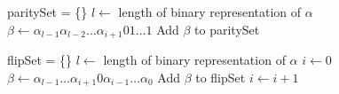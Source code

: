 \begin{algorithm}[htbp]
    \caption{\label{GenerateParitySet}\textsc{GenerateParitySet}}
\begin{algorithmic}[1]
\State paritySet = \{\}
\State $l \gets $ length of binary representation of $\alpha$
        \State $\beta \gets \alpha_{l-1}\alpha_{l-2}\ldots\alpha_{i+1}01\ldots 1$
        \State Add $\beta$ to paritySet 
    \EndIf
\EndFor
\end{algorithmic}
\end{algorithm}
\begin{algorithm}[htbp]
    \caption{\label{GenerateFlipSet}\textsc{GenerateFlipSet}}
\begin{algorithmic}[1]
\State flipSet = \{\}
\State $l \gets $ length of binary representation of $\alpha$
\State $i \gets 0$
    \State $\beta \gets \alpha_{l-1}\ldots \alpha_{i+1}0\alpha_{i-1} \ldots \alpha_0$
    \State Add $\beta$ to flipSet
    \State $i \gets i + 1$
\EndWhile
\end{algorithmic}
\end{algorithm}
\pagebreak
